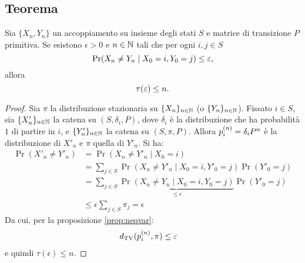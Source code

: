 \subsection{Teorema}
\begin{lemma}[di accoppiamento]
	Sia $\{X_n,Y_n\}$ un accoppiamento su insieme degli stati $S$ e matrice di transizione $P$ primitiva. Se esistono $\epsilon>0$ e $n\in\N$ tali che per ogni $i,j\in S$
	\begin{equation*}
		\Pr(X_n\ne Y_n\mid X_0=i,Y_0=j) \le \epsilon \text,
	\end{equation*}
	allora
	\begin{equation*}
		\tau(\epsilon) \le n \text.
	\end{equation*}
\end{lemma}
\begin{proof}
	Sia $\pi$ la distribuzione stazionaria su $\chain X$ (o $\chain Y$).
	Fissato $i\in S$, sia $\chain{X'}$ la catena su $(S,\delta_i,P)$, dove $\delta_i$ è la distribuzione che ha probabilità $1$ di partire in $i$, e $\chain{Y'}$ la catena su $(S,\pi,P)$. Allora $p\ape{n}_i=\delta_i P^n$ è la distribuzione di $X'_n$ e $\pi$ quella di $Y'_n$.
	Si ha:
	\begin{align*}
		\Pr(X'_n\ne Y'_n) & = \Pr(X_n\ne Y'_n\mid X_0=i)                                                          \\
		                  & = \sum_{j\in S} \Pr(X_n\ne Y'_n\mid X_0=i,Y'_0=j)\Pr(Y'_0=j)                          \\
		                  & = \sum_{j\in S} \underbrace{\Pr(X_n\ne Y_n\mid X_0=i,Y_0=j)}_{\le\epsilon}\Pr(Y'_0=j) \\
		                  & \le \epsilon \sum_{j\in S} \pi_j = \epsilon
	\end{align*}
	Da cui, per la proposizione \ref{prop:neqvar}:
	\begin{align*}
		\dtv(p\ape{n}_i,\pi) & \le \epsilon
	\end{align*}
	e quindi $\tau(\epsilon)\le n$.
\end{proof}
